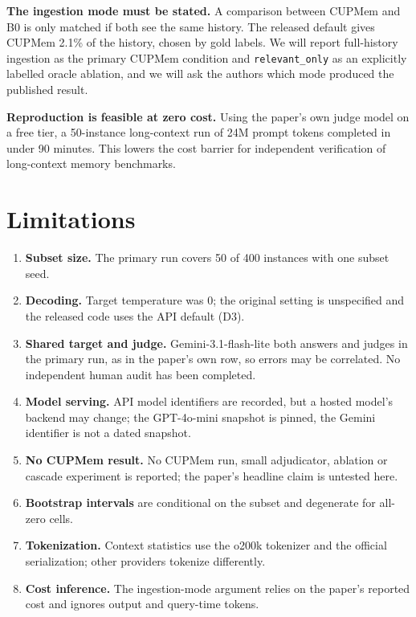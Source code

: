 \documentclass[conference]{IEEEtran}
\newcommand{\code}[1]{\texttt{\small #1}}
\begin{document}
\textbf{The ingestion mode must be stated.} A comparison between CUPMem and B0 is only matched if both see the same history. The released default gives CUPMem 2.1\% of the history, chosen by gold labels. We will report full-history ingestion as the primary CUPMem condition and \code{relevant\_only} as an explicitly labelled oracle ablation, and we will ask the authors which mode produced the published result.

\textbf{Reproduction is feasible at zero cost.} Using the paper's own judge model on a free tier, a 50-instance long-context run of 24M prompt tokens completed in under 90 minutes. This lowers the cost barrier for independent verification of long-context memory benchmarks.

\section{Limitations}
\begin{enumerate}
\item \textbf{Subset size.} The primary run covers 50 of 400 instances with one subset seed.
\item \textbf{Decoding.} Target temperature was 0; the original setting is unspecified and the released code uses the API default (D3).
\item \textbf{Shared target and judge.} Gemini-3.1-flash-lite both answers and judges in the primary run, as in the paper's own row, so errors may be correlated. No independent human audit has been completed.
\item \textbf{Model serving.} API model identifiers are recorded, but a hosted model's backend may change; the GPT-4o-mini snapshot is pinned, the Gemini identifier is not a dated snapshot.
\item \textbf{No CUPMem result.} No CUPMem run, small adjudicator, ablation or cascade experiment is reported; the paper's headline claim is untested here.
\item \textbf{Bootstrap intervals} are conditional on the subset and degenerate for all-zero cells.
\item \textbf{Tokenization.} Context statistics use the o200k tokenizer and the official serialization; other providers tokenize differently.
\item \textbf{Cost inference.} The ingestion-mode argument relies on the paper's reported cost and ignores output and query-time tokens.
\end{enumerate}
\end{document}
